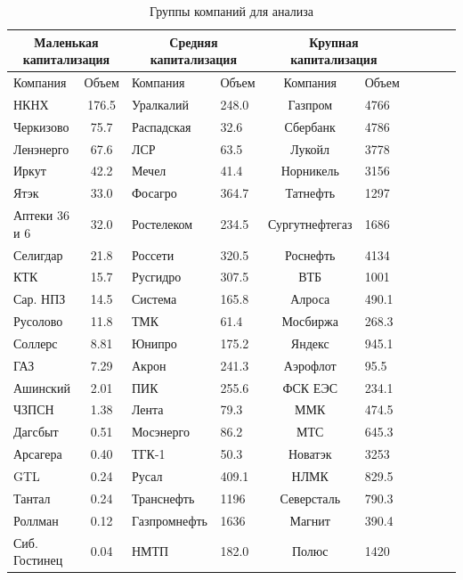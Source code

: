 \documentclass{article}
\begin{document}
\begin{table}[h]
	\centering
	\caption{Группы компаний для анализа}
	\label{tab:table6}
	\begin{tabular}{lcllcllcll}
		
		\multicolumn{2}{c}{Маленькая капитализация} & \multicolumn{2}{c}{Средняя капитализация} &  \multicolumn{2}{c}{Крупная капитализация} \\ 
		\toprule
		Компания& Объем &Компания& Объем&Компания& Объем     \\ \midrule
		НКНХ& 176.5 & Уралкалий&  248.0 & Газпром&  4766   \\
		 Черкизово & 75.7  & Распадская&32.6 & Сбербанк& 4786    \\ 
		  Ленэнерго & 67.6 &ЛСР&   63.5 & Лукойл& 3778 \\
		  Иркут & 42.2&Мечел& 41.4 & Норникель& 3156   \\
		   Ятэк & 33.0&Фосагро&  364.7 &Татнефть& 1297  \\
		  Аптеки 36 и 6& 32.0  &Ростелеком&  234.5 &Сургутнефтегаз& 1686  \\
		   Селигдар & 21.8 &Россети&  320.5 &Роснефть&4134  \\
		 КТК& 15.7 &Русгидро&  307.5 &ВТБ& 1001  \\
		 Сар. НПЗ  & 14.5&Система&  165.8 &Алроса& 490.1  \\
		  Русолово & 11.8 &ТМК& 61.4 & Мосбиржа&268.3   \\
		   Соллерс   & 8.81  &Юнипро& 175.2 & Яндекс&945.1   \\
		 ГАЗ   & 7.29 &Акрон& 241.3 &Аэрофлот&95.5   \\
		 Ашинский& 2.01 &ПИК& 255.6 &ФСК ЕЭС&234.1   \\
		   ЧЗПСН & 1.38 &Лента& 79.3 &ММК&474.5   \\
		    Дагсбыт & 0.51 &Мосэнерго&  86.2 &МТС&645.3  \\
		  Арсагера  & 0.40&ТГК-1&   50.3 &Новатэк&3253 \\
		  GTL& 0.24  &Русал&   409.1 &НЛМК& 829.5 \\
		     Тантал & 0.24  &Транснефть&   1196 &Северсталь&790.3 \\
		 Роллман& 0.12 &Газпромнефть&  1636 &Магнит&390.4  \\		 		 
		   Сиб. Гостинец& 0.04  &НМТП&   182.0 &Полюс&1420 \\		 
		 \bottomrule
		
	\end{tabular}
\end{table}
\end{document}
